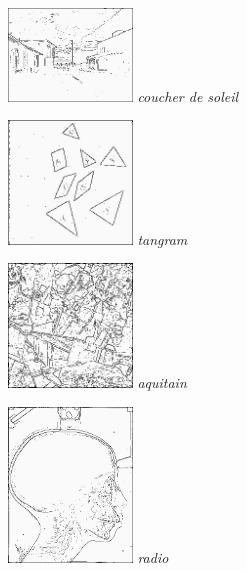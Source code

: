 \documentclass[a4,12pt]{article}
\begin{document}
\noindent
\begin{minipage}[c]{0.20\linewidth}
	\begin{center}
		\includegraphics[width = 33mm]{./img/p2test_grad_fin_soleil.jpg}
		\textit{coucher de soleil}
	\end{center}
\end{minipage}
\begin{minipage}[c]{0.20\linewidth}
	\begin{center}
		\includegraphics[width = 33mm]{./img/p2test_grad_fin_tangram.jpg}
		\textit{tangram}
	\end{center}
\end{minipage}
\begin{minipage}[c]{0.20\linewidth}
	\begin{center}
		\includegraphics[width = 33mm]{./img/p2test_grad_fin_aqitain.jpg}
		\textit{aquitain}
	\end{center}
\end{minipage}
\begin{minipage}[c]{0.20\linewidth}
	\begin{center}
		\includegraphics[width = 33mm]{./img/p2test_grad_fin_radio.jpg}
		\textit{radio}
	\end{center}
\end{minipage}
\end{document}
